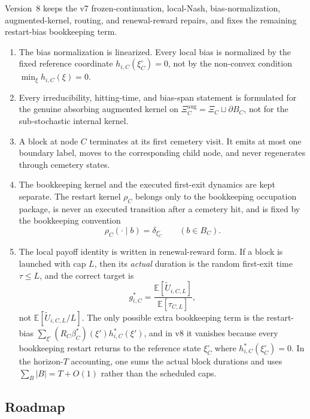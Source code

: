 \documentclass[12pt]{article}
\theoremstyle{definition}
\newcommand{\E}{\mathbb{E}}
\newcommand{\1}{\mathbf{1}}
\begin{document}
Version~8 keeps the v7 frozen-continuation, local-Nash, bias-normalization,
augmented-kernel, routing, and renewal-reward repairs, and fixes the remaining
restart-bias bookkeeping term.

\begin{enumerate}[label=\textnormal{(\arabic*)},leftmargin=2.4em]
\item The bias normalization is linearized. Every local bias is normalized by the
fixed reference coordinate $h_{i,C}(\xi_C^\circ)=0$, not by the non-convex
condition $\min_\xi h_{i,C}(\xi)=0$.
\item Every irreducibility, hitting-time, and bias-span statement is formulated
for the genuine absorbing augmented kernel on
$\Xi_C^{\mathrm{aug}}=\Xi_C\sqcup\partial B_C$, not for the sub-stochastic
internal kernel.
\item A block at node $C$ terminates at its first cemetery visit. It emits at
most one boundary label, moves to the corresponding child node, and never
regenerates through cemetery states.
\item The bookkeeping kernel and the executed first-exit dynamics are kept
separate. The restart kernel $\rho_C$ belongs only to the bookkeeping occupation
package, is never an executed transition after a cemetery hit, and is fixed by
the bookkeeping convention
\[
\rho_C(\cdot\mid b)=\delta_{\xi_C^\circ}
\qquad (b\in B_C).
\]
\item The local payoff identity is written in renewal-reward form. If a block is
launched with cap $L$, then its \emph{actual} duration is the random first-exit
time $\tau\le L$, and the correct target is
\[
g_{i,C}^*
=
\frac{\E[\widetilde U_{i,C,L}]}{\E[\tau_{C,L}]},
\]
not $\E[\widetilde U_{i,C,L}/L]$. The only possible extra bookkeeping term is the
restart-bias
$\sum_{\xi'}(R_C\beta_C^*)(\xi')h_{i,C}^*(\xi')$, and in v8 it vanishes because
every bookkeeping restart returns to the reference state
$\xi_C^\circ$ where $h_{i,C}^*(\xi_C^\circ)=0$. In the horizon-$T$ accounting,
one sums the actual block durations and uses
$\sum_B |B| = T + O(1)$ rather than the scheduled caps.
\end{enumerate}

\subsection{Roadmap}
\end{document}
